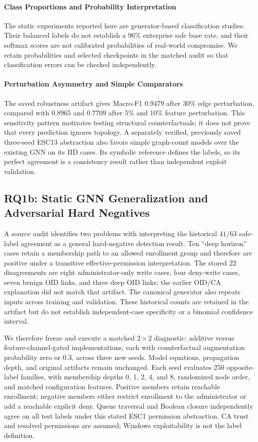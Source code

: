 \paragraph{Class Proportions and Probability Interpretation}
The static experiments reported here are generator-based classification studies. Their balanced labels do not establish a 96\% enterprise safe base rate, and their softmax scores are not calibrated probabilities of real-world compromise. We retain probabilities and selected checkpoints in the matched audit so that classification errors can be checked independently.

\paragraph{Perturbation Asymmetry and Simple Comparators}
The saved robustness artifact gives Macro-F1 $0.9479$ after 30\% edge perturbation, compared with $0.8965$ and $0.7709$ after 5\% and 10\% feature perturbation. This sensitivity pattern motivates testing structural counterfactuals; it does not prove that every prediction ignores topology. A separately verified, previously saved three-seed ESC13 abstraction also favors simple graph-count models over the existing GNN on its IID cases. Its symbolic reference defines the labels, so its perfect agreement is a consistency result rather than independent exploit validation.

\subsection{RQ1b: Static GNN Generalization and Adversarial Hard Negatives}
A source audit identifies two problems with interpreting the historical $41/63$ safe-label agreement as a general hard-negative detection result. Ten ``deep horizon'' cases retain a membership path to an allowed enrollment group and therefore are positive under a transitive effective-permission interpretation. The stored 22 disagreements are eight administrator-only write cases, four deny-write cases, seven benign OID links, and three deep OID links; the earlier OID/CA explanation did not match that artifact. The canonical generator also repeats inputs across training and validation. These historical counts are retained in the artifact but do not establish independent-case specificity or a binomial confidence interval.

We therefore freeze and execute a matched $2\times2$ diagnostic: additive versus feature-channel-gated implementations, each with counterfactual augmentation probability zero or 0.3, across three new seeds. Model equations, propagation depth, and original artifacts remain unchanged. Each seed evaluates 250 opposite-label families, with membership depths 0, 1, 2, 4, and 8, randomized node order, and matched configuration features. Positive members retain reachable enrollment; negative members either restrict enrollment to the administrator or add a reachable explicit deny. Queue traversal and Boolean closure independently agree on all test labels under this stated ESC1 permission abstraction. CA trust and resolved permissions are assumed; Windows exploitability is not the label definition.

